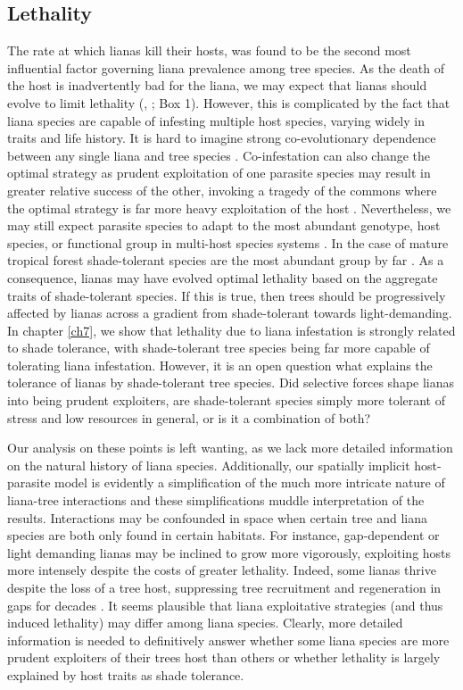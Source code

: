 \documentclass[b5paper,justified]{tufte-book} %
\begin{document}
\begin{fullwidth}
\subsection{Lethality}
The rate at which lianas kill their hosts, was found to be the second most influential factor governing liana prevalence among tree species. As the death of the host is inadvertently bad for the liana, we may expect that lianas should evolve to limit lethality (\citealt{Frank1996}, \citealt{Alizon2009}; Box 1). However, this is complicated by the fact that liana species are capable of infesting multiple host species, varying widely in traits and life history. It is hard to imagine strong co-evolutionary dependence between any single liana and tree species \citep[see also][]{Garrido-Perez2010}. Co-infestation can also change the optimal strategy as prudent exploitation of one parasite species may result in greater relative success of the other, invoking a tragedy of the commons where the optimal strategy is far more heavy exploitation of the host \citep{Frank1996}. Nevertheless, we  may still expect parasite species to adapt to the most abundant genotype, host species, or functional group in multi-host species systems \citep[e.g.][]{Lively2000}. In the case of mature tropical forest shade-tolerant species are the most abundant group by far \citep[e.g.][]{Gilbert2006}. As a consequence, lianas may have evolved optimal lethality based on the aggregate traits of shade-tolerant species. If this is true, then trees should be progressively affected by lianas across a gradient from shade-tolerant towards light-demanding. In chapter \ref{ch7}, we show that lethality due to liana infestation is strongly related to shade tolerance, with shade-tolerant tree species being far more capable of tolerating liana infestation. However, it is an open question what explains the tolerance of lianas by shade-tolerant tree species. Did selective forces shape lianas into being prudent exploiters, are shade-tolerant species simply more tolerant of stress and low resources in general, or is it a combination of both?
  
Our analysis on these points is left wanting, as we lack more detailed information on the natural history of liana species. Additionally, our spatially implicit host-parasite model is evidently a simplification of the much more intricate nature of liana-tree interactions and these simplifications muddle interpretation of the results. Interactions may be confounded in space when certain tree and liana species are both only found in certain habitats. For instance, gap-dependent or light demanding lianas may be inclined to grow more vigorously, exploiting hosts more intensely despite the costs of greater lethality. Indeed, some lianas thrive despite the loss of a tree host, suppressing tree recruitment and regeneration in gaps for decades \citep{Schnitzer2000}.  It seems plausible that liana exploitative strategies (and thus induced lethality) may differ among liana species. Clearly, more detailed information is needed to definitively answer whether some liana species are more prudent exploiters of their trees host than others or whether lethality is largely explained by host traits as shade tolerance. 
 

\end{fullwidth}
\end{document}
